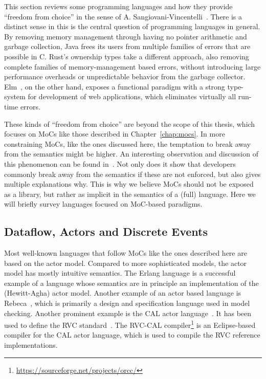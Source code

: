 This section reviews some programming languages and how they provide ``freedom from choice'' in the sense of A. Sangiovani-Vincentelli~\cite{lee2019freedom}.
There is a distinct sense in this is the central question of programming languages in general.
By removing memory management through having no pointer arithmetic and garbage collection, Java frees its users from multiple families of errors that are possible in C.
Rust's ownership types take a different approach, also removing complete families of memory-management based errors, without introducing large performance overheads or unpredictable behavior from the garbage collector.
Elm~\cite{czaplicki_elm}, on the other hand, exposes a functional paradigm with a strong type-system for  development of web applications, which eliminates virtually all run-time errors.

These kinds of ``freedom from choice'' are beyond the scope of this thesis, which focuses on \acp{MoC} like those described in Chapter~\ref{chap:mocs}.
In more constraining  \acp{MoC}, like the ones discussed here, the temptation to break away from the semantics might be higher.
An interesting observation and discussion of this phenomenon can be found in~\cite{tasharofi2013scala}.
Not only does it show that developers commonly break away from the semantics if these are not enforced, but also gives multiple explanations why.
This is why we believe \acp{MoC} should not be exposed as a library, but rather as implicit in the semantics of a (full) language.
Here we will briefly survey languages focused on \ac{MoC}-based paradigms.

\subsection{Dataflow, Actors and Discrete Events}
\label{sec:general_dataflow_tools}

Most well-known languages that follow \acp{MoC} like the ones described here are based on the actor model.
Compared to more sophisticated models, the actor model has mostly intuitive semantics.
The Erlang language is a successful example of a language whose semantics are in principle an implementation of the (Hewitt-Agha) actor model.
Another example of an actor based language is Rebeca~\cite{sirjani2004formal}, which is primarily a design and specification language used in model checking.
Another prominent example is the CAL actor language~\cite{eker2003cal}.
It has been used to define the \ac{RVC} standard~\cite{bhattacharyya2011overview}.
The \ac{RVC}-CAL compiler\footnote{\url{https://sourceforge.net/projects/orcc/}} is an Eclipse-based compiler for the CAL actor language, which is used to compile the \ac{RVC} reference implementations.

